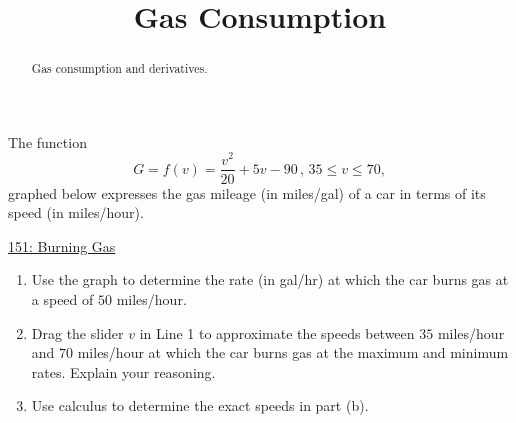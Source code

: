 \documentclass{ximera}
\title{Gas Consumption}
\begin{document}
\begin{abstract}
Gas consumption and derivatives.
\end{abstract}
\maketitle


\begin{question} \label{Q5hhhhgeyghhg}
The function
\[
    G = f(v) = \frac{v^2}{20} + 5v -90 \, , \, 35\leq v \leq 70 ,
\]
graphed below expresses the gas mileage (in miles/gal) of a car in terms of its speed (in miles/hour).

\begin{onlineOnly}
    \begin{center}
\end{center}
\end{onlineOnly}

\href{https://www.desmos.com/calculator/fapdhcqptl}{151: Burning Gas}

\begin{enumerate}
\item Use the graph to determine the rate (in gal/hr) at which the car burns gas at a speed of $50$ miles/hour.

\item Drag the slider $v$ in Line 1 to approximate the speeds between $35$ miles/hour and $70$ miles/hour at which the car burns gas at the maximum and minimum rates. Explain your reasoning.

\item Use calculus to determine the exact speeds in part (b).

\end{enumerate}


\end{question}
\end{document}
